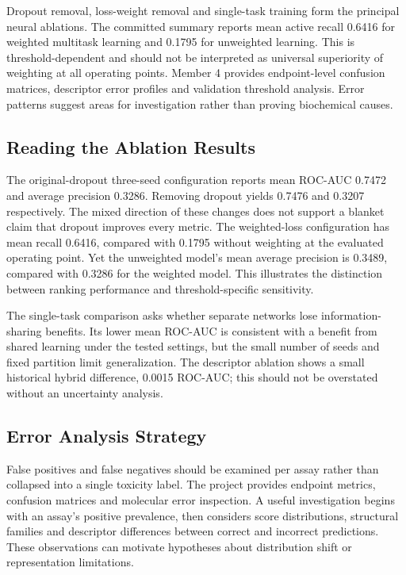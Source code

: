 \documentclass[11pt,a4paper]{article}\usepackage[margin=25mm]{geometry}\usepackage{fancyhdr}\usepackage{setspace}\usepackage{titlesec}\usepackage{xcolor}
\begin{document}
Dropout removal, loss-weight removal and single-task training form the principal neural ablations. The committed summary reports mean active recall 0.6416 for weighted multitask learning and 0.1795 for unweighted learning. This is threshold-dependent and should not be interpreted as universal superiority of weighting at all operating points. Member 4 provides endpoint-level confusion matrices, descriptor error profiles and validation threshold analysis. Error patterns suggest areas for investigation rather than proving biochemical causes.


\subsection{Reading the Ablation Results}
The original-dropout three-seed configuration reports mean ROC-AUC 0.7472 and average precision 0.3286. Removing dropout yields 0.7476 and 0.3207 respectively. The mixed direction of these changes does not support a blanket claim that dropout improves every metric. The weighted-loss configuration has mean recall 0.6416, compared with 0.1795 without weighting at the evaluated operating point. Yet the unweighted model's mean average precision is 0.3489, compared with 0.3286 for the weighted model. This illustrates the distinction between ranking performance and threshold-specific sensitivity.

The single-task comparison asks whether separate networks lose information-sharing benefits. Its lower mean ROC-AUC is consistent with a benefit from shared learning under the tested settings, but the small number of seeds and fixed partition limit generalization. The descriptor ablation shows a small historical hybrid difference, 0.0015 ROC-AUC; this should not be overstated without an uncertainty analysis.

\subsection{Error Analysis Strategy}
False positives and false negatives should be examined per assay rather than collapsed into a single toxicity label. The project provides endpoint metrics, confusion matrices and molecular error inspection. A useful investigation begins with an assay's positive prevalence, then considers score distributions, structural families and descriptor differences between correct and incorrect predictions. These observations can motivate hypotheses about distribution shift or representation limitations.
\end{document}
